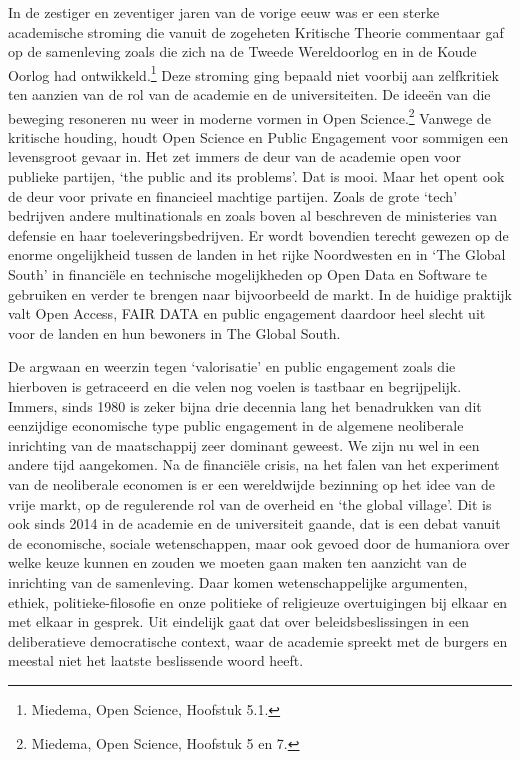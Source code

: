 \documentclass{jote-book}
\begin{document}
	In de zestiger en zeventiger jaren van de vorige eeuw was er een sterke academische stroming die vanuit de zogeheten Kritische Theorie commentaar gaf op de samenleving zoals die zich na de Tweede Wereldoorlog en in de Koude Oorlog had ontwikkeld.\footnote{Miedema, Open Science, Hoofstuk 5.1.} Deze stroming ging bepaald niet voorbij aan zelfkritiek ten aanzien van de rol van de academie en de universiteiten. De ideeën van die beweging resoneren nu weer in moderne vormen in Open Science.\footnote{Miedema, Open Science, Hoofstuk 5 en 7.} Vanwege de kritische houding, houdt Open Science en Public Engagement voor sommigen een levensgroot gevaar in. Het zet immers de deur van de academie open voor publieke partijen, ‘the public and its problems'. Dat is mooi. Maar het opent ook de deur voor private en financieel machtige partijen. Zoals de grote ‘tech' bedrijven andere multinationals en zoals boven al beschreven de ministeries van defensie en haar toeleveringsbedrijven. Er wordt bovendien terecht gewezen op de enorme ongelijkheid tussen de landen in het rijke Noordwesten en in ‘The Global South' in financiële en technische mogelijkheden op Open Data en Software te gebruiken en verder te brengen naar bijvoorbeeld de markt. In de huidige praktijk valt Open Access, FAIR DATA en public engagement daardoor heel slecht uit voor de landen en hun bewoners in The Global South.



	De argwaan en weerzin tegen ‘valorisatie' en public engagement zoals die hierboven is getraceerd en die velen nog voelen is tastbaar en begrijpelijk. Immers, sinds 1980 is zeker bijna drie decennia lang het benadrukken van dit eenzijdige economische type public engagement in de algemene neoliberale inrichting van de maatschappij zeer dominant geweest. We zijn nu wel in een andere tijd aangekomen. Na de financiële crisis, na het falen van het experiment van de neoliberale economen is er een wereldwijde bezinning op het idee van de vrije markt, op de regulerende rol van de overheid en ‘the global village'. Dit is ook sinds 2014 in de academie en de universiteit gaande, dat is een debat vanuit de economische, sociale wetenschappen, maar ook gevoed door de humaniora over welke keuze kunnen en zouden we moeten gaan maken ten aanzicht van de inrichting van de samenleving. Daar komen wetenschappelijke argumenten, ethiek, politieke-filosofie en onze politieke of religieuze overtuigingen bij elkaar en met elkaar in gesprek. Uit eindelijk gaat dat over beleidsbeslissingen in een deliberatieve democratische context, waar de academie spreekt met de burgers en meestal niet het laatste beslissende woord heeft.
\end{document}
